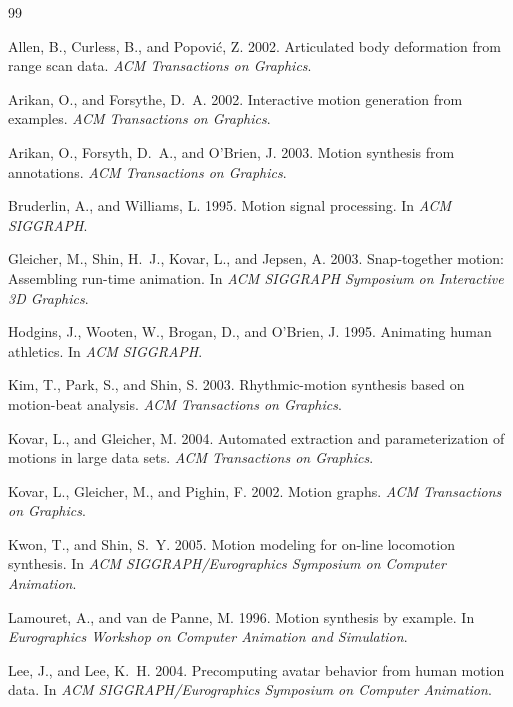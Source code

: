 \documentclass[10pt,twocolumn]{article}
\begin{document}
\begin{thebibliography}{99}

Allen, B., Curless, B., and Popovi\'c, Z. 2002.
Articulated body deformation from range scan data.
\emph{ACM Transactions on Graphics}.

Arikan, O., and Forsythe, D.~A. 2002.
Interactive motion generation from examples.
\emph{ACM Transactions on Graphics}.

Arikan, O., Forsyth, D.~A., and O'Brien, J. 2003.
Motion synthesis from annotations.
\emph{ACM Transactions on Graphics}.

Bruderlin, A., and Williams, L. 1995.
Motion signal processing.
In \emph{ACM SIGGRAPH}.

Gleicher, M., Shin, H.~J., Kovar, L., and Jepsen, A. 2003.
Snap-together motion: Assembling run-time animation.
In \emph{ACM SIGGRAPH Symposium on Interactive 3D Graphics}.

Hodgins, J., Wooten, W., Brogan, D., and O'Brien, J. 1995.
Animating human athletics.
In \emph{ACM SIGGRAPH}.

Kim, T., Park, S., and Shin, S. 2003.
Rhythmic-motion synthesis based on motion-beat analysis.
\emph{ACM Transactions on Graphics}.

Kovar, L., and Gleicher, M. 2004.
Automated extraction and parameterization of motions in large data sets.
\emph{ACM Transactions on Graphics}.

Kovar, L., Gleicher, M., and Pighin, F. 2002.
Motion graphs.
\emph{ACM Transactions on Graphics}.

Kwon, T., and Shin, S.~Y. 2005.
Motion modeling for on-line locomotion synthesis.
In \emph{ACM SIGGRAPH/Eurographics Symposium on Computer Animation}.

Lamouret, A., and van de Panne, M. 1996.
Motion synthesis by example.
In \emph{Eurographics Workshop on Computer Animation and Simulation}.

Lee, J., and Lee, K.~H. 2004.
Precomputing avatar behavior from human motion data.
In \emph{ACM SIGGRAPH/Eurographics Symposium on Computer Animation}.


\end{thebibliography}
\end{document}
